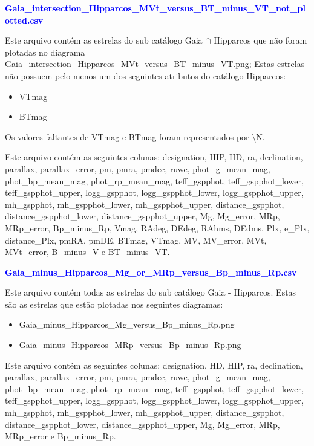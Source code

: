 \documentclass{article}
\begin{document}
	\newpage
	
	\textcolor{blue}{\textbf{Gaia\_intersection\_Hipparcos\_MVt\_versus\_BT\_minus\_VT\_not\_plotted.csv}}
	
	\vspace{10pt}

	Este arquivo contém as estrelas do sub catálogo Gaia $\cap$ Hipparcos que não foram plotadas no diagrama Gaia\_intersection\_Hipparcos\_MVt\_versus\_BT\_minus\_VT.png; 
	Estas estrelas não possuem pelo menos um dos seguintes atributos do catálogo Hipparcos: 
	
	\begin{itemize}
		\item VTmag
		\item BTmag
	\end{itemize}

	Os valores faltantes de VTmag e BTmag foram representados por \textbackslash N.
	
	Este arquivo contém as seguintes colunas:
	designation, HIP, HD, ra, declination, parallax, parallax\_error, pm, pmra, pmdec, ruwe, phot\_g\_mean\_mag, phot\_bp\_mean\_mag, phot\_rp\_mean\_mag, teff\_gspphot, teff\_gspphot\_lower, teff\_gspphot\_upper, logg\_gspphot, logg\_gspphot\_lower, logg\_gspphot\_upper, mh\_gspphot, mh\_gspphot\_lower, mh\_gspphot\_upper, distance\_gspphot, distance\_gspphot\_lower, distance\_gspphot\_upper, Mg, Mg\_error, MRp, MRp\_error, Bp\_minus\_Rp, Vmag, RAdeg, DEdeg, RAhms, DEdms, Plx, e\_Plx, distance\_Plx, pmRA, pmDE, BTmag, VTmag, MV, MV\_error, MVt, MVt\_error, B\_minus\_V e BT\_minus\_VT.
	
	\vspace{10pt}

	\textcolor{blue}{\textbf{Gaia\_minus\_Hipparcos\_Mg\_or\_MRp\_versus\_Bp\_minus\_Rp.csv}}
		
	\vspace{10pt}
	
	Este arquivo contém todas as estrelas do sub catálogo Gaia - Hipparcos. 
	Estas são as estrelas que estão plotadas nos seguintes diagramas: 
	
	\begin{itemize}
		\item Gaia\_minus\_Hipparcos\_Mg\_versus\_Bp\_minus\_Rp.png 
		\item Gaia\_minus\_Hipparcos\_MRp\_versus\_Bp\_minus\_Rp.png
	\end{itemize}
	
	Este arquivo contém as seguintes colunas:
	designation, HD, HIP, ra, declination, parallax, parallax\_error, pm, pmra, pmdec, ruwe, phot\_g\_mean\_mag, phot\_bp\_mean\_mag, phot\_rp\_mean\_mag, teff\_gspphot, teff\_gspphot\_lower, teff\_gspphot\_upper, logg\_gspphot, logg\_gspphot\_lower, logg\_gspphot\_upper, mh\_gspphot, mh\_gspphot\_lower, mh\_gspphot\_upper, distance\_gspphot, distance\_gspphot\_lower, distance\_gspphot\_upper, Mg, Mg\_error, MRp, MRp\_error e Bp\_minus\_Rp.
	
\end{document}
